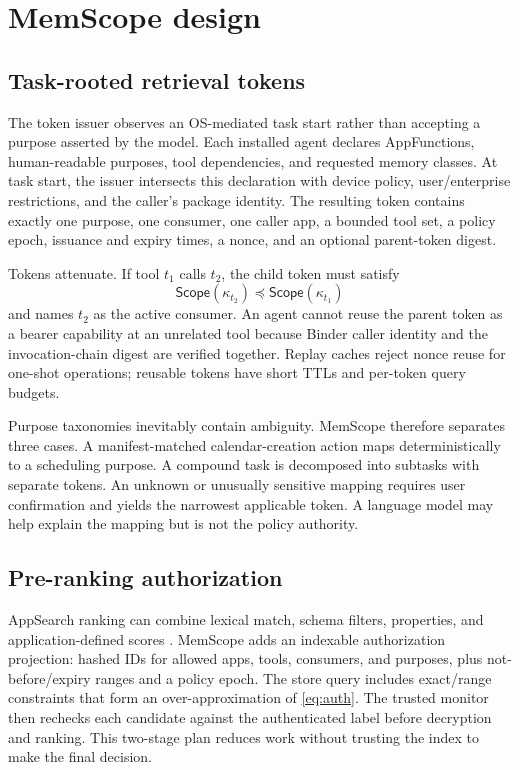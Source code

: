 \section{MemScope design}
\label{sec:method}

\subsection{Task-rooted retrieval tokens}

The token issuer observes an OS-mediated task start rather than accepting a purpose asserted by the model. Each installed agent declares AppFunctions, human-readable purposes, tool dependencies, and requested memory classes. At task start, the issuer intersects this declaration with device policy, user/enterprise restrictions, and the caller's package identity. The resulting token contains exactly one purpose, one consumer, one caller app, a bounded tool set, a policy epoch, issuance and expiry times, a nonce, and an optional parent-token digest.

Tokens attenuate. If tool $t_1$ calls $t_2$, the child token must satisfy
\begin{equation}
\mathsf{Scope}(\kappa_{t_2})\preceq\mathsf{Scope}(\kappa_{t_1})
\end{equation}
and names $t_2$ as the active consumer. An agent cannot reuse the parent token as a bearer capability at an unrelated tool because Binder caller identity and the invocation-chain digest are verified together. Replay caches reject nonce reuse for one-shot operations; reusable tokens have short TTLs and per-token query budgets.

Purpose taxonomies inevitably contain ambiguity. MemScope therefore separates three cases. A manifest-matched calendar-creation action maps deterministically to a scheduling purpose. A compound task is decomposed into subtasks with separate tokens. An unknown or unusually sensitive mapping requires user confirmation and yields the narrowest applicable token. A language model may help explain the mapping but is not the policy authority.

\subsection{Pre-ranking authorization}

AppSearch ranking can combine lexical match, schema filters, properties, and application-defined scores \citep{android2026appsearch}. MemScope adds an indexable authorization projection: hashed IDs for allowed apps, tools, consumers, and purposes, plus not-before/expiry ranges and a policy epoch. The store query includes exact/range constraints that form an over-approximation of \cref{eq:auth}. The trusted monitor then rechecks each candidate against the authenticated label before decryption and ranking. This two-stage plan reduces work without trusting the index to make the final decision.

